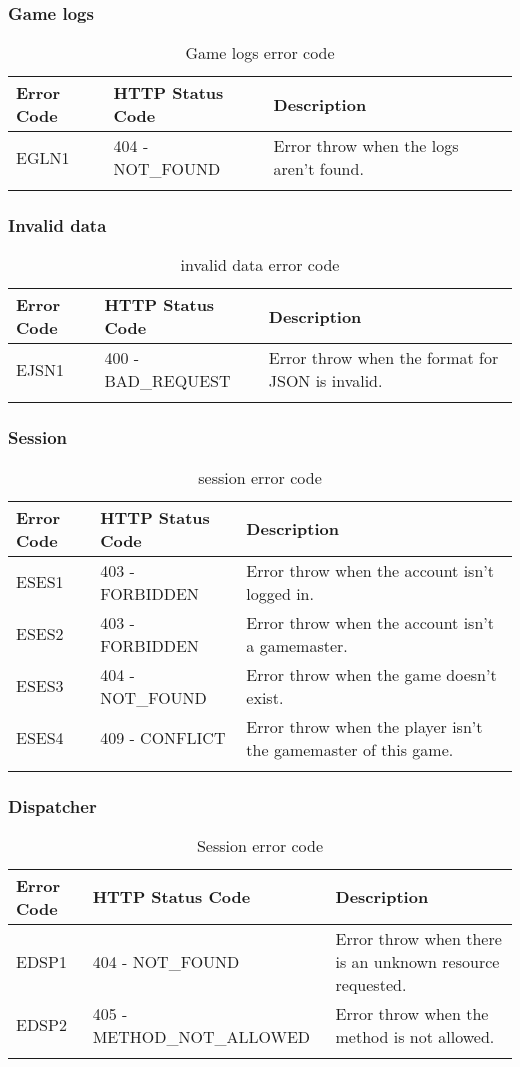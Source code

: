 \subsubsection{Game logs}
\begin{longtable}{|p{}|p{} |p{}|} 
    \hline
    \textbf{Error Code} & \textbf{HTTP Status Code} & \textbf{Description} \\\hline
    EGLN1 & 404 - NOT\_FOUND & Error throw when the logs aren't found.\\\hline
    \caption{Game logs error code}
    \label{tab:game_logs_error_code}
\end{longtable}
\subsubsection{Invalid data}
\begin{longtable}{|p{}|p{} |p{}|} 
    \hline
    \textbf{Error Code} & \textbf{HTTP Status Code} & \textbf{Description} \\\hline
    EJSN1 & 400 - BAD\_REQUEST & Error throw when the format for JSON is invalid.\\\hline
    \caption{invalid data error code}
    \label{tab:invalid_data_error_code}
\end{longtable}
\subsubsection{Session}
\begin{longtable}{|p{}|p{} |p{}|} 
    \hline
    \textbf{Error Code} & \textbf{HTTP Status Code} & \textbf{Description} \\\hline
    ESES1 & 403 - FORBIDDEN & Error throw when the account isn't logged in.\\\hline
    ESES2 & 403 - FORBIDDEN & Error throw when the account isn't a gamemaster.\\\hline
    ESES3 & 404 - NOT\_FOUND & Error throw when the game doesn't exist.\\\hline
    ESES4 & 409 - CONFLICT & Error throw when the player isn't the gamemaster of this game.\\\hline
    \caption{session error code}
    \label{tab:session_error_code}
\end{longtable}
\subsubsection{Dispatcher}
\begin{longtable}{|p{}|p{} |p{}|} 
    \hline
    \textbf{Error Code} & \textbf{HTTP Status Code} & \textbf{Description} \\\hline
    EDSP1 & 404 - NOT\_FOUND & Error throw when there is an unknown resource requested.\\\hline
    EDSP2 & 405 - METHOD\_NOT\_ALLOWED & Error throw when the method is not allowed.\\\hline
    \caption{Session error code}
    \label{tab:session_error_code}
\end{longtable}
